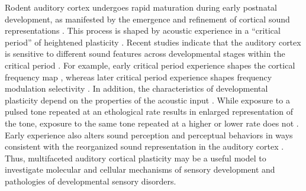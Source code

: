 Rodent auditory cortex undergoes rapid maturation during early postnatal development, as manifested by the emergence and refinement of cortical sound representations \cite{Zhang2001, Chang2005, DeVillers-Sidani2007, Insanally2009}. This process is shaped by acoustic experience in a “critical period” of heightened plasticity \cite{DeVillers-Sidani2007}. Recent studies indicate that the auditory cortex is sensitive to different sound features across developmental stages within the critical period \cite{Insanally2009, Popescu2010a}. For example, early critical period experience shapes the cortical frequency map \cite{DeVillers-Sidani2007, Insanally2009}, whereas later critical period experience shapes frequency modulation selectivity \cite{Insanally2009, Insanally2010}. In addition, the characteristics of developmental plasticity depend on the properties of the acoustic input \cite{Chang2003, Zhou2008}. While exposure to a pulsed tone repeated at an ethological rate results in enlarged representation of the tone, exposure to the same tone repeated at a higher or lower rate does not \cite{Kim2009}. Early experience also alters sound perception and perceptual behaviors in ways consistent with the reorganized sound representation in the auditory cortex \cite{Han2007}. Thus, multifaceted auditory cortical plasticity may be a useful model to investigate molecular and cellular mechanisms of sensory development and pathologies of developmental sensory disorders.

